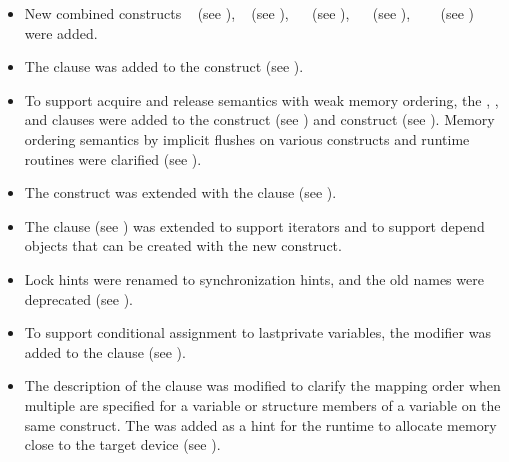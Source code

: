 \begin{itemize}
\item New combined constructs ~
     (see ), ~
     (see ), 
     ~~ (see ),
     ~~ (see ),
     ~~~
     (see ) were added.

\item The  clause was added to the  construct
      (see ).

\item To support acquire and release semantics with weak memory ordering, the
      , , and  clauses were added to
      the  construct (see ) and
       construct (see ).
      Memory ordering semantics by implicit flushes on various constructs and
      runtime routines were clarified (see ).

\item The  construct was extended with the  clause
      (see ).

\item The  clause (see ) was
      extended to support iterators and to support depend objects that can be created with the new
       construct.

\item Lock hints were renamed to synchronization hints, and the
      old names were deprecated (see ).

\item To support conditional assignment to lastprivate variables, the
       modifier was added to the 
      clause (see ).

\item The description of the  clause was modified to clarify 
      the mapping order when multiple  are specified for
      a variable or structure members of a variable on the same
      construct. The   was added as a hint
      for the runtime to allocate memory close to the target device 
      (see ).


\end{itemize}
